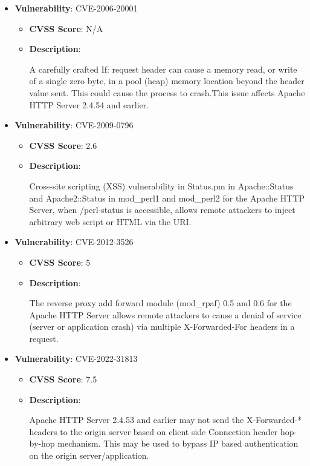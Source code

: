 \documentclass{article}
\begin{document}
\begin{itemize}
        \item \textbf{Vulnerability}: CVE-2006-20001
        \begin{itemize}
            \item \textbf{CVSS Score}:  N/A 
            \item \textbf{Description}:
            \parbox[t]{0.9\linewidth}{
                \ttfamily A carefully crafted If: request header can cause a memory read, or write of a single zero byte, in a pool (heap) memory location beyond the header value sent. This could cause the process to crash.This issue affects Apache HTTP Server 2.4.54 and earlier.
            }
        \end{itemize}
    
        \item \textbf{Vulnerability}: CVE-2009-0796
        \begin{itemize}
            \item \textbf{CVSS Score}:  2.6 
            \item \textbf{Description}:
            \parbox[t]{0.9\linewidth}{
                \ttfamily Cross-site scripting (XSS) vulnerability in Status.pm in Apache::Status and Apache2::Status in mod\_perl1 and mod\_perl2 for the Apache HTTP Server, when /perl-status is accessible, allows remote attackers to inject arbitrary web script or HTML via the URI.
            }
        \end{itemize}
    
        \item \textbf{Vulnerability}: CVE-2012-3526
        \begin{itemize}
            \item \textbf{CVSS Score}:  5 
            \item \textbf{Description}:
            \parbox[t]{0.9\linewidth}{
                \ttfamily The reverse proxy add forward module (mod\_rpaf) 0.5 and 0.6 for the Apache HTTP Server allows remote attackers to cause a denial of service (server or application crash) via multiple X-Forwarded-For headers in a request.
            }
        \end{itemize}
    
        \item \textbf{Vulnerability}: CVE-2022-31813
        \begin{itemize}
            \item \textbf{CVSS Score}:  7.5 
            \item \textbf{Description}:
            \parbox[t]{0.9\linewidth}{
                \ttfamily Apache HTTP Server 2.4.53 and earlier may not send the X-Forwarded-* headers to the origin server based on client side Connection header hop-by-hop mechanism. This may be used to bypass IP based authentication on the origin server/application.
            }
        \end{itemize}
    

\end{itemize}
\end{document}
